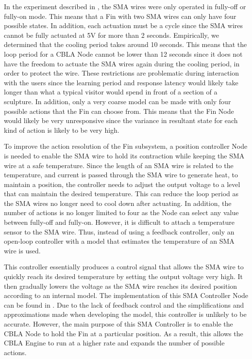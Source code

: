 In the experiment described in , the SMA wires were only operated in fully-off or fully-on mode. This means that a Fin with two SMA wires can only have four possible states. In addition, each actuation must be a cycle since the SMA wires cannot be fully actuated at 5V for more than 2 seconds. Empirically, we determined that the cooling period takes around 10 seconds. This means that the loop period for a CBLA Node cannot be lower than 12 seconds since it does not have the freedom to actuate the SMA wires again during the cooling period, in order to protect the wire. These restrictions are problematic during interaction with the users since the learning period and response latency would likely take longer than what a typical visitor would spend in front of a section of a sculpture. In addition, only a very coarse model can be made with only four possible actions that the Fin can choose from. This means that the Fin Node would likely be very unresponsive since the variance in resultant state for each kind of action is likely to be very high.

To improve the action resolution of the Fin subsystem, a position controller Node is needed to enable the SMA wire to hold its contraction while keeping the SMA wire at a safe temperature. Since the length of an SMA wire is related to the temperature, and current is passed through the SMA wire to generate heat, to maintain a position, the controller needs to adjust the output voltage to a level that can maintain the desired temperature. This can reduce the loop period as the SMA wires no longer need to cool down after actuating. In addition, the number of actions is no longer limited to four as the Node can select any value between fully-off and fully-on. However, it is difficult to attach a temperature sensor to the SMA wire. Thus, instead of using a feedback controller, only an open-loop controller with a model that estimates the temperature of an SMA wire is used.

This controller essentially produces a control signal that allows the SMA wire to quickly reach its desired temperature by setting the output voltage very high. It then gradually lowers the voltage as the SMA wire reaches its desired position according to an internal model. The implementation of this SMA Controller Node can be found in . Due to the lack of feedback control and the simplifications and approximations made when developing the model, this controller is unlikely to be accurate. However, the main purpose of this SMA Controller is to enable the CBLA Node to hold the Fin at a particular position. As a result, this allows the CBLA Engine to run at a higher rate and expands the number of possible actions. 


